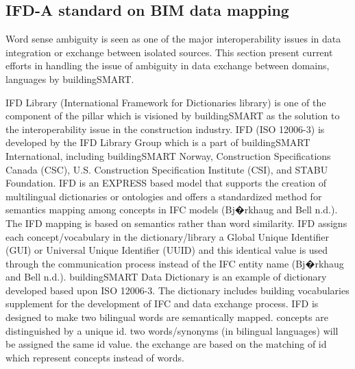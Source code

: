 \documentclass[Journal, InsideFigs, DoubleSpace]{ascelike} %
\begin{document}
\subsection{IFD-A standard on BIM data mapping}
Word sense ambiguity is seen as one of the major interoperability issues in data integration or exchange between isolated sources. This section present current efforts in handling the issue of ambiguity in data exchange between domains, languages by buildingSMART.
\par
IFD Library (International Framework for Dictionaries library) is one of the component of the pillar which is visioned by buildingSMART as the solution to the interoperability issue in the construction industry. IFD (ISO 12006-3) is developed by the IFD Library Group which is a part of buildingSMART International, including buildingSMART Norway, Construction Specifications Canada (CSC), U.S. Construction Specification Institute (CSI), and STABU Foundation.  IFD is an EXPRESS based model that supports the creation of multilingual dictionaries or ontologies and offers a standardized method for semantics mapping among concepts in IFC models (Bj�rkhaug and Bell n.d.). The IFD mapping is based on semantics rather than word similarity. IFD assigns each concept/vocabulary in the dictionary/library a Global Unique Identifier (GUI) or Universal Unique Identifier (UUID) and this identical value is used through the communication process instead of the IFC entity name (Bj�rkhaug and Bell n.d.). buildingSMART Data Dictionary is an example of dictionary developed based upon ISO 12006-3. The dictionary includes building vocabularies supplement for the development of IFC and data exchange process. IFD is designed to make two bilingual words are semantically mapped. concepts are distinguished by a unique id. two words/synonyms (in bilingual languages) will be assigned the same id value. the exchange are based on the matching of id which represent concepts instead of words. 

%
\end{document}
